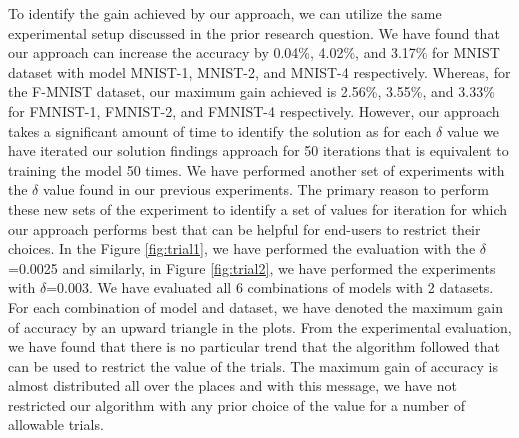 To identify the gain achieved by our approach, we can utilize the same experimental setup discussed in the prior research question. We have found that our approach can increase the accuracy by 0.04\%, 4.02\%, and 3.17\% for MNIST dataset with model MNIST-1, MNIST-2, and MNIST-4 respectively. Whereas, for the F-MNIST dataset, our maximum gain achieved is 2.56\%, 3.55\%, and 3.33\% for FMNIST-1, FMNIST-2, and FMNIST-4 respectively. However, our approach takes a significant amount of time to identify the solution as for each $\delta$ value we have iterated our solution findings approach for 50 iterations that is equivalent to training the model 50 times. We have performed another set of experiments with the $\delta$ value found in our previous experiments. The primary reason to perform these new sets of the experiment to identify a set of values for iteration for which our approach performs best that can be helpful for end-users to restrict their choices. In the Figure \ref{fig:trial1}, we have performed the evaluation with the $\delta$=0.0025 and similarly, in Figure \ref{fig:trial2}, we have performed the experiments with $\delta$=0.003. We have evaluated all 6 combinations of models with 2 datasets. For each combination of model and dataset, we have denoted the maximum gain of accuracy by an upward triangle in the plots. From the experimental evaluation, we have found that there is no particular trend that the algorithm followed that can be used to restrict the value of the trials. The maximum gain of accuracy is almost distributed all over the places and with this message, we have not restricted our algorithm with any prior choice of the value for a number of allowable trials.

